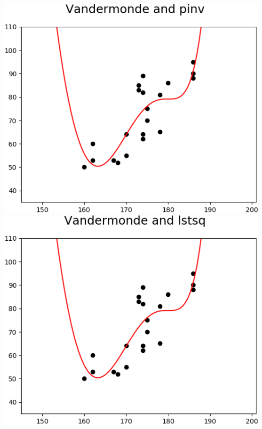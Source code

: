 \documentclass{beamer}
\begin{document}
\begin{frame}
\begin{columns}[t]
		\centering
		\includegraphics[width=0.9\linewidth]{graphics/polyvander_pinv_mark}\\
		\vspace{0.2cm}
		\includegraphics[width=0.9\linewidth]{graphics/polyvander_lstsq_mark}
	\end{columns}
\end{frame}


%
%

\end{document}
